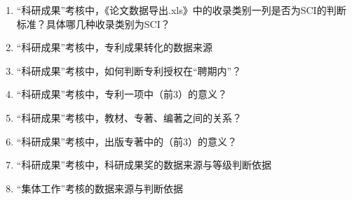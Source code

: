 \documentclass[UTF8,fontset=windowsnew]{ctexart}
\begin{document}
\begin{enumerate}
  \item ``科研成果''考核中，《论文数据导出.xls》中的收录类别一列是否为SCI的判断标准？具体哪几种收录类别为SCI？
  \item ``科研成果''考核中，专利成果转化的数据来源
  \item ``科研成果''考核中，如何判断专利授权在``聘期内''？
  \item ``科研成果''考核中，专利一项中（前3）的意义？
  \item ``科研成果''考核中，教材、专著、编著之间的关系？
  \item ``科研成果''考核中，出版专著中的（前3）的意义？
  \item ``科研成果''考核中，科研成果奖的数据来源与等级判断依据
  \item ``集体工作''考核的数据来源与判断依据
\end{enumerate}
\end{document}
